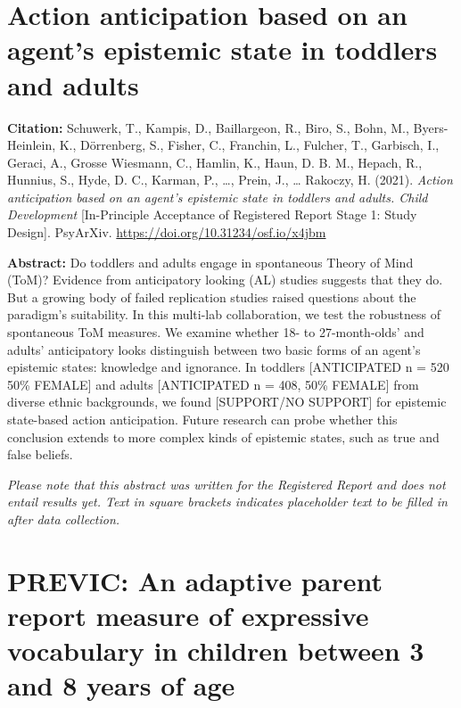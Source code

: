 \documentclass[
]{scrbook}
\begin{document}
\section*{Action anticipation based on an agent's epistemic state in toddlers and adults}\label{manybabies}

\textbf{Citation:} Schuwerk, T., Kampis, D., Baillargeon, R., Biro, S., Bohn, M., Byers-Heinlein, K., Dörrenberg, S., Fisher, C., Franchin, L., Fulcher, T., Garbisch, I., Geraci, A., Grosse Wiesmann, C., Hamlin, K., Haun, D. B. M., Hepach, R., Hunnius, S., Hyde, D. C., Karman, P., \ldots, Prein, J., \ldots{} Rakoczy, H. (2021). \emph{Action anticipation based on an agent's epistemic state in toddlers and adults. Child Development} {[}In-Principle Acceptance of Registered Report Stage 1: Study Design{]}. PsyArXiv. \mbox{\url{https://doi.org/10.31234/osf.io/x4jbm}}

\textbf{Abstract:} Do toddlers and adults engage in spontaneous Theory of Mind (ToM)? Evidence from anticipatory looking (AL) studies suggests that they do. But a growing body of failed replication studies raised questions about the paradigm's suitability. In this multi-lab collaboration, we test the robustness of spontaneous ToM measures. We examine whether 18- to 27-month-olds' and adults' anticipatory looks distinguish between two basic forms of an agent's epistemic states: knowledge and ignorance. In toddlers {[}ANTICIPATED n = 520 50\% FEMALE{]} and adults {[}ANTICIPATED n = 408, 50\% FEMALE{]} from diverse ethnic backgrounds, we found {[}SUPPORT/NO SUPPORT{]} for epistemic state-based action anticipation. Future research can probe whether this conclusion extends to more complex kinds of epistemic states, such as true and false beliefs.

\emph{Please note that this abstract was written for the Registered Report and does not entail results yet. Text in square brackets indicates placeholder text to be filled in after data collection.}

\newpage

\section*{PREVIC: An adaptive parent report measure of expressive vocabulary in children between 3 and 8 years of age}\label{previc}
\end{document}

